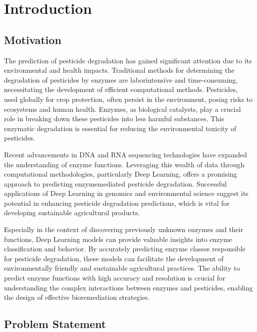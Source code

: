 \section{Introduction}

\subsection{Motivation}
\label{sec:Motivation}

The prediction of pesticide degradation has gained significant attention due to its environmental and health impacts. Traditional methods for determining the degradation of pesticides by enzymes are laborintensive and time-consuming, necessitating the development of efficient computational methods. Pesticides, used globally for crop protection, often persist in the environment, posing risks to ecosystems and human health. Enzymes, as biological catalysts, play a crucial role in breaking down these pesticides into less harmful substances. This enzymatic degradation is essential for reducing the environmental toxicity of pesticides.

Recent advancements in DNA and RNA sequencing technologies have expanded the understanding of enzyme functions. Leveraging this wealth of data through computational methodologies, particularly Deep Learning, offers a promising approach to predicting enzymemediated pesticide degradation. Successful applications of Deep Learning in genomics and environmental science suggest its potential in enhancing pesticide degradation predictions, which is vital for developing sustainable agricultural products.

Especially in the context of discovering previously unknown enzymes and their functions, Deep Learning models can provide valuable insights into enzyme classification and behavior. By accurately predicting enzyme classes responsible for pesticide degradation, these models can facilitate the development of environmentally friendly and sustainable agricultural practices. The ability to predict enzyme functions with high accuracy and resolution is crucial for understanding the complex interactions between enzymes and pesticides, enabling the design of effective bioremediation strategies.

\subsection{Problem Statement}
\label{sec:Problem Statement}

